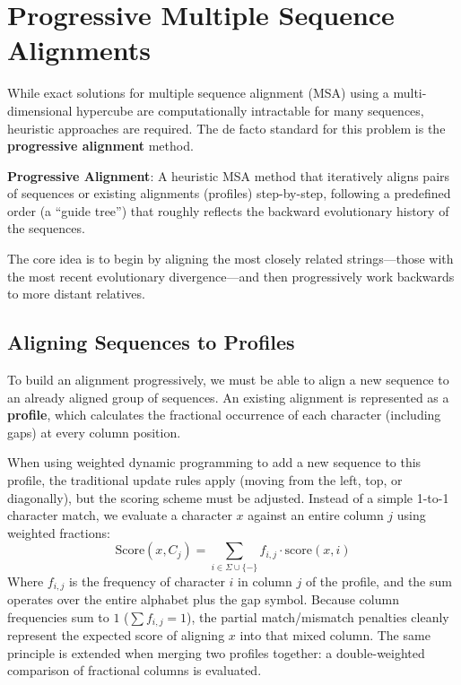 

\section{Progressive Multiple Sequence Alignments}

While exact solutions for multiple sequence alignment (MSA) using a multi-dimensional hypercube are computationally intractable for many sequences, heuristic approaches are required. The de facto standard for this problem is the \textbf{progressive alignment} method.

\begin{important}
  \textbf{Progressive Alignment}: A heuristic MSA method that iteratively aligns pairs of sequences or existing alignments (profiles) step-by-step, following a predefined order (a ``guide tree'') that roughly reflects the backward evolutionary history of the sequences.
\end{important}

The core idea is to begin by aligning the most closely related strings—those with the most recent evolutionary divergence—and then progressively work backwards to more distant relatives.

\subsection{Aligning Sequences to Profiles}
To build an alignment progressively, we must be able to align a new sequence to an already aligned group of sequences. An existing alignment is represented as a \textbf{profile}, which calculates the fractional occurrence of each character (including gaps) at every column position.

When using weighted dynamic programming to add a new sequence to this profile, the traditional update rules apply (moving from the left, top, or diagonally), but the scoring scheme must be adjusted. Instead of a simple 1-to-1 character match, we evaluate a character $x$ against an entire column $j$ using weighted fractions:
\[
  \text{Score}(x, C_j) = \sum_{i \in \Sigma \cup \{-\}} f_{i,j} \cdot \text{score}(x, i)
\]
Where $f_{i,j}$ is the frequency of character $i$ in column $j$ of the profile, and the sum operates over the entire alphabet plus the gap symbol. Because column frequencies sum to $1$ ($\sum f_{i,j} = 1$), the partial match/mismatch penalties cleanly represent the expected score of aligning $x$ into that mixed column. The same principle is extended when merging two profiles together: a double-weighted comparison of fractional columns is evaluated.

